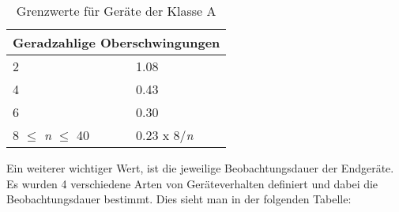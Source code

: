 \begin{table}[ht!]
\begin{tabular}{|l|l|}
		\multicolumn{2}{|c|}{Geradzahlige Oberschwingungen}                                                                                                                \\ \hline
		2                                            & 1.08                                                                                                                \\
		4                                            & 0.43                                                                                                                \\
		6                                            & 0.30                                                                                                                \\
		8 $\leq$ \textit{n} $\leq$ 40                & 0.23 x 8/\textit{n}                                                                                                 \\ \hline
	\end{tabular}
\caption{Grenzwerte für Geräte der Klasse A}\label{tab:Grenzwerte_Normen}
\end{table}


Ein weiterer wichtiger Wert, ist die jeweilige Beobachtungsdauer der Endgeräte. Es wurden 4 verschiedene Arten von Geräteverhalten definiert und dabei die Beobachtungsdauer bestimmt. Dies sieht man in der folgenden Tabelle:

